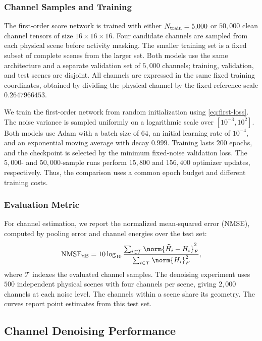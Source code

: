 \subsubsection{Channel Samples and Training}
The first-order score network is trained with either
$N_{\rm train}=5{,}000$ or $50{,}000$ clean channel tensors of size
$16\times16\times16$. Four candidate channels are sampled from each
physical scene before activity masking. The smaller training set is a
fixed subset of complete scenes from the larger set. Both models use
the same architecture and a separate validation set of $5{,}000$
channels; training, validation, and test scenes are disjoint.
All channels are expressed in the same fixed training coordinates,
obtained by dividing the physical channel by the fixed reference
scale $0.2647966453$.

We train the first-order network from random initialization using
\eqref{eq:first-loss}. The noise variance is sampled uniformly on a
logarithmic scale over $[10^{-3},10^2]$. Both models use Adam with a
batch size of $64$, an initial learning rate of $10^{-4}$, and an
exponential moving average with decay $0.999$. Training lasts $200$
epochs, and the checkpoint is selected by the minimum fixed-noise
validation loss. The $5{,}000$- and $50{,}000$-sample runs perform
$15{,}800$ and $156{,}400$ optimizer updates, respectively. Thus, the
comparison uses a common epoch budget and different training costs.

\subsubsection{Evaluation Metric}
For channel estimation, we report the normalized mean-squared error
(NMSE), computed by pooling error and channel energies over the test set:
\begin{equation}
 \mathrm{NMSE}_{\rm dB}
 =10\log_{10}\frac{\sum_{i\in\mathcal T}
 \norm{\widehat H_i-H_i}_F^2}
 {\sum_{i\in\mathcal T}\norm{H_i}_F^2},
 \label{eq:simulation-nmse}
\end{equation}
where $\mathcal T$ indexes the evaluated channel samples.
The denoising experiment uses $500$ independent physical scenes with
four channels per scene, giving $2{,}000$ channels at each noise level.
The channels within a scene share its geometry. The curves report
point estimates from this test set.

\subsection{Channel Denoising Performance}
\label{sec:denoising-performance}

